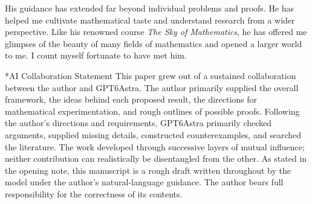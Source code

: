 \documentclass[10pt,letterpaper]{amsart}
\makeatletter
\numberwithin{equation}{section}
\theoremstyle{definition}
\def\section{\@startsection{section}{1}
  \z@{1.1\linespacing\@plus.5\linespacing}{.6\linespacing}
  {\normalfont\fontsize{13}{16}\selectfont\bfseries\boldmath\centering}}
\makeatother
\begin{document}
His guidance has extended far beyond individual problems and proofs. He has helped me cultivate mathematical taste and understand research from a wider perspective. Like his renowned course \emph{The Sky of Mathematics}, he has offered me glimpses of the beauty of many fields of mathematics and opened a larger world to me. I count myself fortunate to have met him.

\section*{AI Collaboration Statement}
This paper grew out of a sustained collaboration between the author and GPT6Astra. The author primarily supplied the overall framework, the ideas behind each proposed result, the directions for mathematical experimentation, and rough outlines of possible proofs. Following the author's directions and requirements, GPT6Astra primarily checked arguments, supplied missing details, constructed counterexamples, and searched the literature. The work developed through successive layers of mutual influence; neither contribution can realistically be disentangled from the other. As stated in the opening note, this manuscript is a rough draft written throughout by the model under the author's natural-language guidance. The author bears full responsibility for the correctness of its contents.
\end{document}
